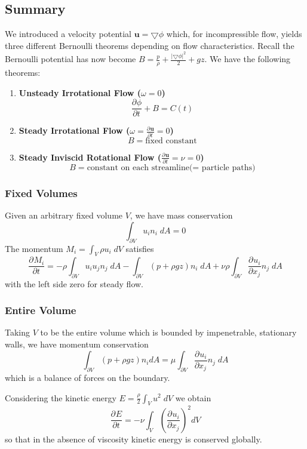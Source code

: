 \documentclass[11pt]{article}
\newcommand*{\pd}[3][]{\ensuremath{\frac{\partial^{#1} {#2}}{\partial {#3}^{#1}}}}
\newcommand{\grad}{\bigtriangledown}
\newcommand{\mv}[1]{\textbf{#1}}
\newcommand{\mdf}[1]{{\color{red}#1}}
\newcommand{\abs}[1]{|#1|}
\begin{document}
\subsection{Summary}
We introduced a velocity potential $\mv{u}=\grad\phi$ which, for incompressible flow, yields three different Bernoulli theorems depending on flow characteristics. Recall the \mdf{Bernoulli potential} has now become $B=\frac{p}{\rho}+\frac{\abs{\grad\phi}^2}{2}+gz$.
We have the following theorems:
\begin{enumerate}
	\item \textbf{Unsteady Irrotational Flow ($\omega=0$)}
		$$\pd{\phi}{t}+B=C(t)$$
	\item \textbf{Steady Irrotational Flow ($\omega=\pd{\mv{u}}{t}=0$)}
		$$B=\text{fixed constant}$$
	\item \textbf{Steady Inviscid Rotational Flow ($\pd{\mv{u}}{t}=\nu=0$)}
		$$B=\text{constant on each streamline(= particle paths)}$$
\end{enumerate}
\subsubsection{Fixed Volumes}
Given an arbitrary fixed volume $V$, we have mass conservation
$$\int_{\partial V}u_in_i\;dA=0$$
The \mdf{momentum} $M_i=\int_V \rho u_i\;dV$ satisfies
$$\pd{M_i}{t}=-\rho\int_{\partial V}u_iu_jn_j\;dA-\int_{\partial V}(p+\rho gz)n_i\;dA+\nu\rho\int_{\partial V}\pd{u_i}{x_j}n_j\;dA$$
with the left side zero for steady flow.
\subsubsection{Entire Volume}
Taking $V$ to be the entire volume which is bounded by impenetrable, stationary walls, we have momentum conservation
$$\int_{\partial V}(p+\rho gz)n_idA = \mu\int_{\partial V}\pd{u_i}{x_j}n_j\;dA$$
which is a balance of forces on the boundary.

Considering the \mdf{kinetic energy} $E=\frac{\rho}{2}\int_V u^2\;dV$ we obtain
$$\pd{E}{t}=-\nu\int_V \left(\pd{u_i}{x_j}\right)^2dV$$
so that in the absence of viscosity kinetic energy is conserved globally.
\end{document}
